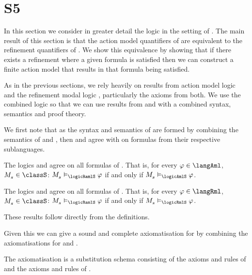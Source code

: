 \section{S5}\label{aaml-s5}

In this section we consider in greater detail the logic \logicAamlS{} in the setting of \classS{}.
The main result of this section is that the action model quantifiers of \logicAamlS{} are equivalent to the refinement quantifiers of \logicRmlS{}.
We show this equivalence by showing that if there exists a refinement where a given formula is satisfied then we can construct a finite action model that results in that formula being satisfied.

As in the previous sections, we rely heavily on results from action model logic \logicAmlS{} and the refinement modal logic \logicRmlS{}, particularly the axioms from both.
We use the combined logic \logicRamlS{} so that we can use results from \logicAmlS{} and \logicRmlS{} with a combined syntax, semantics and proof theory.

We first note that as the syntax and semantics of \logicRamlS{} are formed by combining the semantics of \logicAmlS{} and \logicRmlS{}, then \logicAmlS{} and \logicRmlS{} agree with \logicRamlS{} on formulas from their respective sublanguages.

\begin{lemma}\label{raml-s5-aml}
The logics \logicRamlS{} and \logicAmlS{} agree on all formulas of \langAml{}.
That is, for every $\phi \in \langAml$, $\kPModel{\kStateS} \in \classS$: $\kPModel{\kStateS} \entails_\logicRamlS \phi$ if and only if $\kPModel{\kStateS} \entails_\logicAmlS \phi$.
\end{lemma}

\begin{lemma}\label{raml-s5-rml}
The logics \logicRamlS{} and \logicAmlS{} agree on all formulas of \langRml{}.
That is, for every $\phi \in \langRml$, $\kPModel{\kStateS} \in \classS$: $\kPModel{\kStateS} \entails_\logicRamlS \phi$ if and only if $\kPModel{\kStateS} \entails_\logicRmlS \phi$.
\end{lemma}

These results follow directly from the definitions.

Given this we can give a sound and complete axiomatisation for \logicRamlS{} by combining the axiomatisations for \logicAmlS{} and \logicRmlS{}.

\begin{definition}\label{raml-s5-axiomatisation}
The axiomatisation \axiomAamlS{} is a substitution schema consisting of the axioms and rules of \axiomAmlS{} and the axioms and rules of \axiomRmlS{}.
\end{definition}

